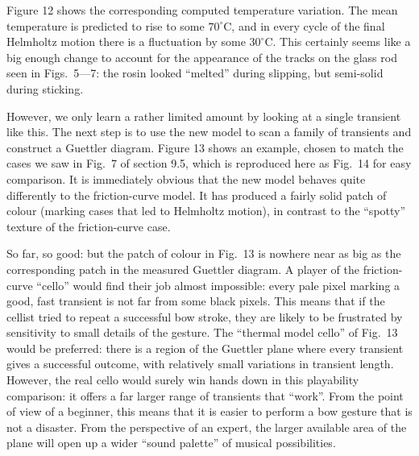 
  Figure 12 shows the corresponding computed temperature variation. The mean 
  temperature is predicted to rise to some $70^\circ$C, and in every cycle of 
  the final Helmholtz motion there is a fluctuation by some $30^\circ$C. This 
  certainly seems like a big enough change to account for the appearance of the 
  tracks on the glass rod seen in Figs.\ 5—7: the rosin looked ``melted'' 
  during slipping, but semi-solid during sticking. 


  However, we only learn a rather limited amount by looking at a single 
  transient like this. The next step is to use the new model to scan a family 
  of transients and construct a Guettler diagram. Figure 13 shows an example, 
  chosen to match the cases we saw in Fig.\ 7 of section 9.5, which is 
  reproduced here as Fig.\ 14 for easy comparison. It is immediately obvious 
  that the new model behaves quite differently to the friction-curve model. It 
  has produced a fairly solid patch of colour (marking cases that led to 
  Helmholtz motion), in contrast to the “spotty” texture of the friction-curve 
  case. 




  So far, so good: but the patch of colour in Fig.\ 13 is nowhere near as big 
  as the corresponding patch in the measured Guettler diagram. A player of the 
  friction-curve “cello” would find their job almost impossible: every pale 
  pixel marking a good, fast transient is not far from some black pixels. This 
  means that if the cellist tried to repeat a successful bow stroke, they are 
  likely to be frustrated by sensitivity to small details of the gesture. The 
  “thermal model cello” of Fig.\ 13 would be preferred: there is a region of 
  the Guettler plane where every transient gives a successful outcome, with 
  relatively small variations in transient length. However, the real cello 
  would surely win hands down in this playability comparison: it offers a far 
  larger range of transients that “work”. From the point of view of a beginner, 
  this means that it is easier to perform a bow gesture that is not a disaster. 
  From the perspective of an expert, the larger available area of the plane 
  will open up a wider “sound palette” of musical possibilities. 

